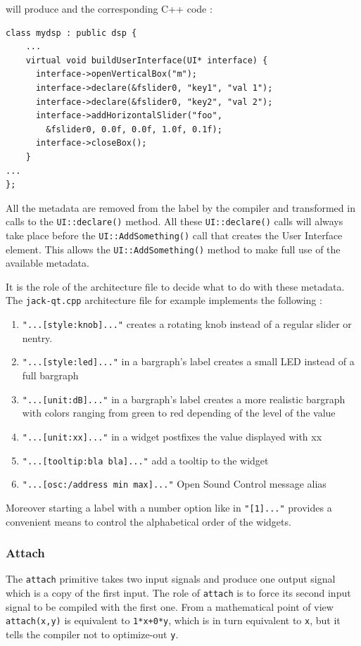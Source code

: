 will produce and the corresponding C++ code :

\begin{lstlisting}
class mydsp : public dsp {
	...
	virtual void buildUserInterface(UI* interface) {
	  interface->openVerticalBox("m");
	  interface->declare(&fslider0, "key1", "val 1");
	  interface->declare(&fslider0, "key2", "val 2");
	  interface->addHorizontalSlider("foo", 
	  	&fslider0, 0.0f, 0.0f, 1.0f, 0.1f);
	  interface->closeBox();
	}
...
};
\end{lstlisting}

All the metadata are removed from the label by the compiler and 
transformed in calls to the \lstinline'UI::declare()' method. All these 
\lstinline'UI::declare()' calls will always take place before the \lstinline'UI::AddSomething()' 
call that creates the User Interface element. This allows the 
\lstinline'UI::AddSomething()'  method to make full use of the available metadata.

It is the role of the architecture file to decide what to do with these 
metadata. The \lstinline'jack-qt.cpp' architecture file for example implements the 
following :
\begin{enumerate}
\item \lstinline'"...[style:knob]..."' creates a rotating knob instead of a regular 
slider or nentry.
\item \lstinline'"...[style:led]..."' in a bargraph's label creates a small LED instead 
of a full bargraph
\item \lstinline'"...[unit:dB]..."' in a bargraph's label creates a more realistic 
bargraph with colors ranging from green to red depending of the level of 
the value
\item \lstinline'"...[unit:xx]..."' in a widget postfixes the value displayed with xx
\item \lstinline'"...[tooltip:bla bla]..."' add a tooltip to the widget
\item \lstinline'"...[osc:/address min max]..."' Open Sound Control message alias
\end{enumerate}

Moreover starting a label with a number option like in \lstinline'"[1]..."' provides
a convenient means to control the alphabetical order of the widgets.

\subsubsection{Attach}
The \lstinline'attach' primitive takes two input signals and produce one output signal which is a copy of the first input. The role of \lstinline'attach' is to force its second input signal to be compiled with the first one. From a mathematical point of view \lstinline'attach(x,y)' is equivalent to \lstinline'1*x+0*y', which is in turn equivalent to \lstinline'x', but it tells the compiler not to optimize-out \lstinline'y'.

